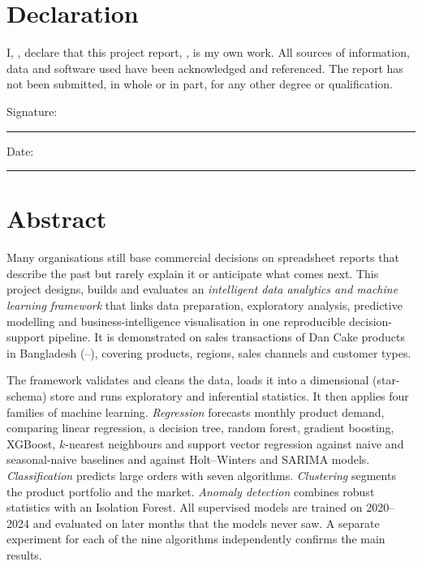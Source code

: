 \chapter*{Declaration}
I, \StudentName, declare that this project report, \emph{\ProjectTitle}, is my own work. All sources of
information, data and software used have been acknowledged and referenced. The report has not been submitted,
in whole or in part, for any other degree or qualification.

\vspace{2cm}
\noindent Signature: \rule{6cm}{0.4pt}\hfill Date: \rule{4cm}{0.4pt}

\chapter*{Abstract}
Many organisations still base commercial decisions on spreadsheet reports that describe the past but rarely
explain it or anticipate what comes next. This project designs, builds and evaluates an
\emph{intelligent data analytics and machine learning framework} that links data preparation, exploratory
analysis, predictive modelling and business-intelligence visualisation in one reproducible decision-support
pipeline. It is demonstrated on \NRows sales transactions of Dan Cake products in Bangladesh
(\DateMin--\DateMax), covering \NProducts products, \NRegions regions, \NChannels sales channels and
\NCustTypes customer types.

The framework validates and cleans the data, loads it into a dimensional (star-schema) store and runs
exploratory and inferential statistics. It then applies four families of machine learning. \emph{Regression}
forecasts monthly product demand, comparing linear regression, a decision tree, random forest, gradient
boosting, XGBoost, $k$-nearest neighbours and support vector regression against naive and seasonal-naive
baselines and against Holt--Winters and SARIMA models. \emph{Classification} predicts large orders with seven
algorithms. \emph{Clustering} segments the product portfolio and the market. \emph{Anomaly detection} combines
robust statistics with an Isolation Forest. All supervised models are trained on 2020--2024 and evaluated on
\TestMonths later months that the models never saw. A separate experiment for each of the nine algorithms
independently confirms the main results.

